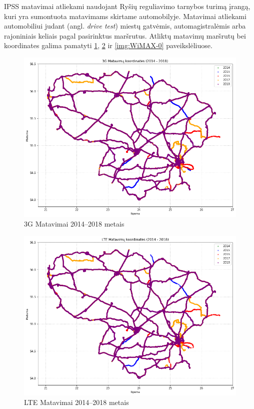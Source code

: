 \documentclass{VUMIFPSbakalaurinis}
\begin{document}
IPSS matavimai atliekami naudojant Ryšių reguliavimo tarnybos turimą įrangą, kuri yra sumontuota matavimams skirtame automobilyje. Matavimai atliekami automobiliui judant (angl. \textit{drive test}) miestų gatvėmis, automagistralėmis arba rajoniniais keliais pagal pasirinktus maršrutus. Atliktų matavimų maršrutų bei koordinates galima pamatyti \ref{img:3G-0}, \ref{img:LTE-0} ir \ref{img:WiMAX-0} paveikslėliuose.
\begin{figure}[H]
	\centering
	\includegraphics[scale=0.5]{img/3G-0}
	\caption{3G Matavimai 2014–2018 metais}
	\label{img:3G-0}
\end{figure}
\begin{figure}[H]
	\centering
	\includegraphics[scale=0.5]{img/LTE-0}
	\caption{LTE Matavimai 2014–2018 metais}
	\label{img:LTE-0}
\end{figure}
\end{document}
